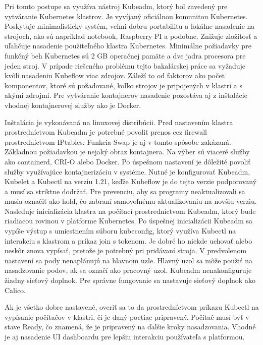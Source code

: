 Pri tomto postupe sa využíva nástroj Kubeadm, ktorý bol zavedený pre vytváranie Kubernetes klastrov. Je vyvíjaný oficiálnou komunitou Kubernetes. Poskytuje minimalisticky systém, veľmi dobru portabilitu a lokálne nasadenie na strojoch, ako sú napríklad notebook, Raspberry PI a podobne. Znižuje zložitosť a uľahčuje nasadenie použiteľného klastra Kubernetes. Minimálne požiadavky pre funkčný beh Kubernetes sú 2 GB operačnej pamäte a dve jadra procesora pre jeden stroj. V prípade riešeného problému tejto bakalárskej práce sa vyžaduje kvôli nasadeniu Kubeflow viac zdrojov. Záleží to od faktorov ako počet komponentov, ktoré sú požadované, koľko strojov je pripojených v klastri a s akými zdrojmi. Pre vytváranie kontajnerov nasadenie pozostáva aj z inštalácie vhodnej kontajnerovej služby ako je Docker.

Inštalácia je vykonávaná na linuxovej distribúcii. Pred nastavením klastra prostredníctvom Kubeadm je potrebné povoliť prenos cez firewall prostredníctvom IPtables. Funkcia Swap je aj v tomto spôsobe zakázaná. Základnou požiadavkou je nejaký obraz kontajnera. Na výber sú viaceré služby ako containerd, CRI-O alebo Docker. Po úspešnom nastavení je dôležité povoliť služby využívajúce kontajnerizáciu v systéme. Nutné je konfigurovať Kubeadm, Kubelet a Kubectl na verziu 1.21, keďže Kubeflow je do tejto verzie podporovaný a musí sa striktne dodržať. Pre prevenciu, aby sa programy neaktualizovali sa musia označiť ako hold, čo zabraní samovoľnému aktualizovaniu na novšiu verziu. Nasleduje inicializácia klastra na počítací prostredníctvom Kubeadm, ktorý bude riadiacou rovinou v platforme Kubernetes. Po úspešnej inicializácii Kubeadm sa vypíše výstup s umiestnením súboru kubeconfig, ktorý využíva Kubectl na interakciu s klastrom a príkaz join s tokenom. Je dobré ho niekde uchovať alebo neskôr znova vypísať, pretože je potrebný pri pridávaní stroja. V predvolenom nastavení sa pody nenaplánujú na hlavnom uzle. Hlavný uzol sa môže použiť na nasadzovanie podov, ak sa označí ako pracovný uzol. Kubeadm nenakonfiguruje žiadny sieťový doplnok. Pre správne fungovanie sa nastavuje sieťový doplnok ako Calico.

Ak je všetko dobre nastavené, overiť sa to da prostredníctvom príkazu Kubectl na vypísanie počítačov v klastri, či je daný poctiac pripravený. Počítač musí byť v stave Ready, čo znamená, že je pripravený na ďalšie kroky nasadzovania. Vhodné je aj nasadenie UI dashboardu pre lepšiu interakciu používateľa s platformou.

